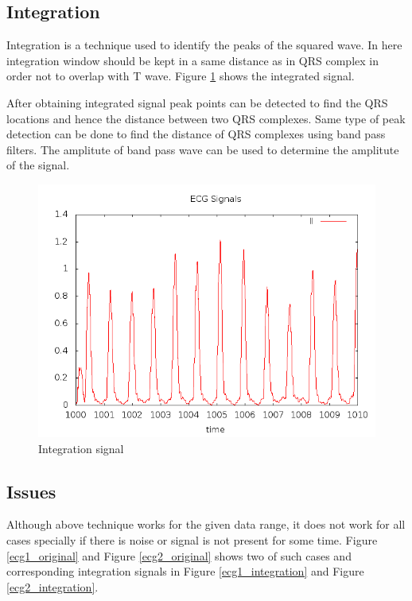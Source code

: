 \subsection{Integration}
Integration is a technique used to identify the peaks of the squared wave. In here integration window should be kept in a same distance as in QRS complex in order not to overlap with T wave. Figure \ref{integration_signal} shows the integrated signal.

After obtaining integrated signal peak points can be detected to find the QRS locations and hence the distance between two QRS complexes. Same type of peak detection can be done to find the distance of QRS complexes using band pass filters. The amplitute of band pass wave can be used to determine the amplitute of the signal. 
\begin{figure}
        \centering
        \includegraphics[width=\textwidth]{ecg_integration.png}
        \caption{Integration signal}
        \label{integration_signal}
\end{figure}
\subsection{Issues}
Although above technique works for the given data range, it does not work for all cases specially if there is noise or signal is not present for some time. Figure \ref{ecg1_original} and Figure \ref{ecg2_original} shows two of such cases and corresponding integration signals in Figure \ref{ecg1_integration} and Figure \ref{ecg2_integration}.

